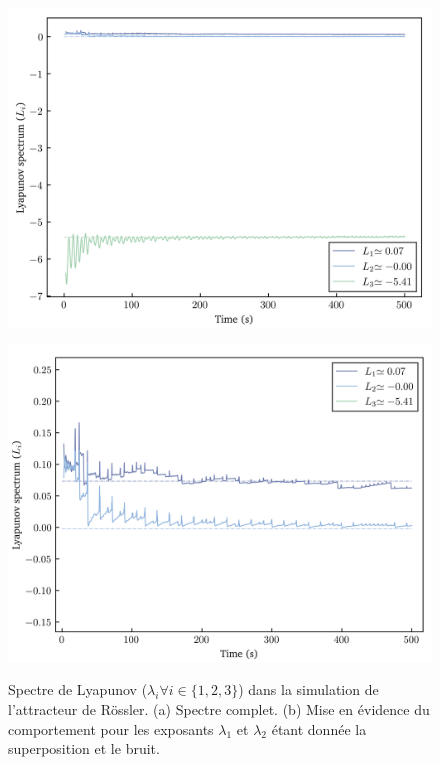     \begin{figure}[h!]
        \centering
        \begin{minipage}{0.49\textwidth}
          \centering
          \includegraphics[scale = 0.4]{figs/lyapunovs/lyap_rossler.png}
          \subcaption{}
          \label{fig: lyap_rossler}
        \end{minipage}
        \begin{minipage}{0.49\textwidth}
          \centering
          \includegraphics[scale = 0.4]{figs/lyapunovs/lyap_rossler_zoom.png}
          \subcaption{}
          \label{fig: lyap_rossler_zoom}
        \end{minipage}
        \caption{Spectre de Lyapunov ($\lambda_i\forall i\in\{1, 2, 3\}$) dans
        la simulation de l'attracteur de Rössler. (a) Spectre complet. (b) Mise
    en évidence du comportement pour les exposants $\lambda_1$ et $\lambda_2$
étant donnée la superposition et le bruit.}
        \label{fig : lyaps_rossler}
    \end{figure}


